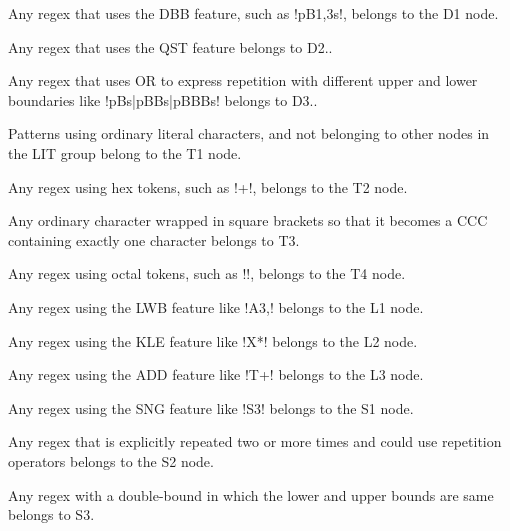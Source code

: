 \begin{description}  \itemsep -1pt
\item[D1:] Any regex that uses the DBB feature, such as \cverb!pB{1,3}s!, belongs to the D1 node.
\item[D2:] Any regex that uses the QST feature belongs to D2..
\item[D3:] Any regex that uses OR to express repetition with different upper and lower boundaries like \cverb!pBs|pBBs|pBBBs! belongs to D3..
\end{description}

\begin{description}  \itemsep -1pt
\item[T1:] Patterns using ordinary literal characters, and not belonging to other nodes in the LIT group belong to the T1 node.
\item[T2:] Any regex using hex tokens, such as \cverb!+!, belongs to the T2 node.
\item[T3:]  Any ordinary character wrapped in square brackets so that it becomes a CCC containing exactly one character belongs to T3.
\item[T4:] Any regex using octal tokens, such as \cverb!!, belongs to the T4 node.
\end{description}

\begin{description}  \itemsep -1pt
\item[L1:] Any regex using the LWB feature like \cverb!A{3,}! belongs to the L1 node.
\item[L2:] Any regex using the KLE feature like \cverb!X*! belongs to the L2 node.
\item[L3:] Any regex using the ADD feature like \cverb!T+! belongs to the L3 node.
\end{description}

\begin{description}  \itemsep -1pt
\item[S1:] Any regex using the SNG feature like \cverb!S{3}! belongs to the S1 node.
\item[S2:] Any regex that is explicitly repeated two or more times and could use repetition operators belongs to the S2 node.
\item[S3:] Any regex with a double-bound in which the lower and upper bounds are same belongs to S3.
\end{description}

